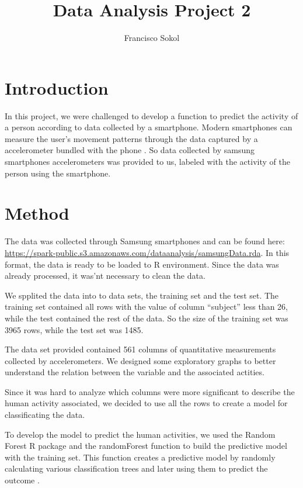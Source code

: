 \documentclass[IEEEtran]{IEEEtran}
\begin{document}
\title{Data Analysis Project 2}
\author{Francisco Sokol}

\maketitle

\IEEEpeerreviewmaketitle

\section{Introduction}

In this project, we were challenged to develop a function to predict the
activity of a person according to data collected by a smartphone. Modern
smartphones can measure the user's movement patterns through the data captured
by a accelerometer bundled with the phone \cite{acelerometro}. So data collected by samsung
smartphones accelerometers was provided to us, labeled with the activity of the
person using the smartphone.

\section{Method}

The data was collected through Samsung smartphones and can be found here:
\url{https://spark-public.s3.amazonaws.com/dataanalysis/samsungData.rda}. In
this format, the data is ready to be loaded to R environment. Since the data
was already processed, it was'nt necessary to clean the data.

We spplited the data into to data sets, the training set and the test set. The
training set contained all rows with the value of column ``subject'' less than
26, while the test contained the rest of the data. So the size of the training
set was 3965 rows, while the test set was 1485.

The data set provided contained 561 columns of quantitative measurements
collected by accelerometers. We designed some exploratory graphs to better
understand the relation between the variable and the associated actities.

Since it was hard to analyze which columns were more significant to describe
the human activity associated, we decided to use all the rows to create a model
for classificating the data.

To develop the model to predict the human activities, we used the Random Forest
R package and the randomForest function to build the predictive model with the
training set. This function creates a predictive model by randomly calculating
various classification trees and later using them to predict the outcome
\cite{random-forest}.
\end{document}
